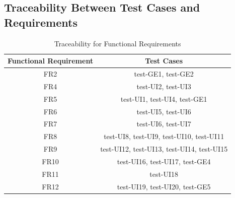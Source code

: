 \documentclass[12pt, titlepage]{article}
\begin{document}
\subsection{Traceability Between Test Cases and Requirements}%
\begin{table}[H]
  \begin{center}
    \caption{Traceability for Functional Requirements}
    \label{tab:table1}
    \begin{tabular}{c|c} 
        \toprule
        \textbf{Functional Requirement} & \textbf{Test Cases}\\
        \midrule
        FR2 & test-GE1, test-GE2\\
        \hline
        FR4 & test-UI2, test-UI3\\
        \hline
        FR5 & test-UI1, test-UI4, test-GE1\\
        \hline
        FR6 & test-UI5, test-UI6\\
        \hline
        FR7 & test-UI6, test-UI7\\
        \hline
        FR8 & test-UI8, test-UI9, test-UI10, test-UI11\\
        \hline
        FR9 &  test-UI12, test-UI13, test-UI14, test-UI15\\
        \hline
        FR10 & test-UI16, test-UI17, test-GE4\\
        \hline
        FR11 & test-UI18\\
        \hline
        FR12 & test-UI19, test-UI20, test-GE5\\
        \bottomrule
    \end{tabular}
  \end{center}
\end{table}
\end{document}
